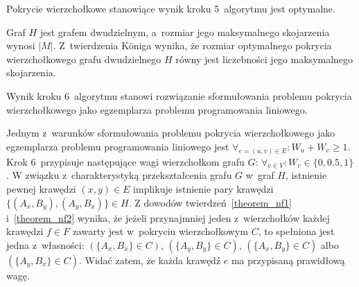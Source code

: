 \begin{theorem}\label{theorem_nf2}
  Pokrycie wierzchołkowe stanowiące wynik kroku 5\ algorytmu jest optymalne.
\end{theorem}
\begin{bproof}
  Graf $H$ jest grafem dwudzielnym, a~rozmiar jego maksymalnego skojarzenia wynosi $|M|$.
  Z~twierdzenia K\"oniga wynika, że rozmiar optymalnego pokrycia wierzchołkowego grafu dwudzielnego $H$ równy jest liczebności jego maksymalnego skojarzenia.
\end{bproof}
\begin{theorem}
  Wynik kroku 6~algorytmu stanowi rozwiązanie sformułowania problemu pokrycia wierzchołkowego jako egzemplarza problemu programowania liniowego.
\end{theorem}
\begin{bproof}
  Jednym z~warunków sformułowania problemu pokrycia wierzchołkowego jako egzemplarza problemu programowania liniowego jest $\forall_{e=(u,v) \in E}: W_u + W_v \geq 1$.
  Krok 6\ przypisuje następujące wagi wierzchołkom grafu $G$: $\forall_{v \in V}: W_v \in \{0, 0.5, 1\}$.
  W związku z~charakterystyką przekształcenia grafu $G$ w~graf $H$, istnienie pewnej krawędzi $(x,y) \in E$ implikuje istnienie pary krawędzi $\{(A_x, B_y), (A_y, B_x)\} \in H$.
  Z dowodów twierdzeń~\ref{theorem_nf1} i~\ref{theorem_nf2} wynika, że jeżeli przynajmniej jeden z~wierzchołków każdej krawędzi $f \in F$ zawarty jest w~pokryciu wierzchołkowym $C$, to spełniona jest jedna z~własności: $(\{A_x, B_x\} \in C)$, $(\{A_y, B_y\} \in C)$, $(\{A_x, B_y\} \in C)$ albo $(\{A_y, B_x\} \in C)$.
  Widać zatem, że każda krawędź $e$ ma przypisaną prawidłową wagę.
\end{bproof}